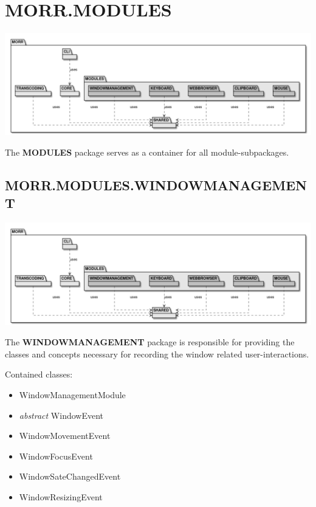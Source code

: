 \newpage
\section{MORR.MODULES}

\begin{center}
    \includegraphics[width=1.0\textwidth]{resources/Packages/AllPackages.png}
\end{center}

The \textbf{MODULES} package serves as a container for all module-subpackages.

\subsection*{MORR.MODULES.WINDOWMANAGEMENT}

\begin{center}
    \includegraphics[width=1.0\textwidth]{resources/Packages/AllPackages.png}
\end{center}

The \textbf{WINDOWMANAGEMENT} package is responsible for providing the classes and concepts necessary for recording the window related user-interactions.

Contained classes:
\begin{itemize}
\item WindowManagementModule
\item \textit{abstract} WindowEvent
\item WindowMovementEvent
\item WindowFocusEvent
\item WindowSateChangedEvent
\item WindowResizingEvent
\end{itemize}
\newpage
